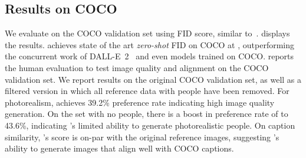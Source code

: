 \subsection{Results on COCO}
\label{sec:experiments_mscoco}

    
    





\label{sec:zero_shot_mscoco}
We evaluate \name on the COCO validation set using FID score, similar to~\citep{ramesh-dalle, nichol-glide}.
 displays the results. \name achieves state of the art \emph{zero-shot} FID on COCO at \ourmscocofid,  outperforming the concurrent work of DALL-E~2~\cite{ramesh-dalle2} and even models trained on COCO.
 reports the human evaluation to test image quality and alignment on the COCO validation set. 
We report results on the original COCO validation set, as well as a filtered version in which all reference data with people have been removed. For photorealism, \name achieves 39.2\% preference rate indicating high image quality  generation.  On the set with no people, there is a boost in preference rate of \name to 43.6\%,  indicating \name's limited ability to generate photorealistic people. On caption similarity, \name's score is on-par with the original reference images, suggesting \name's ability to generate images that align well with COCO captions.
